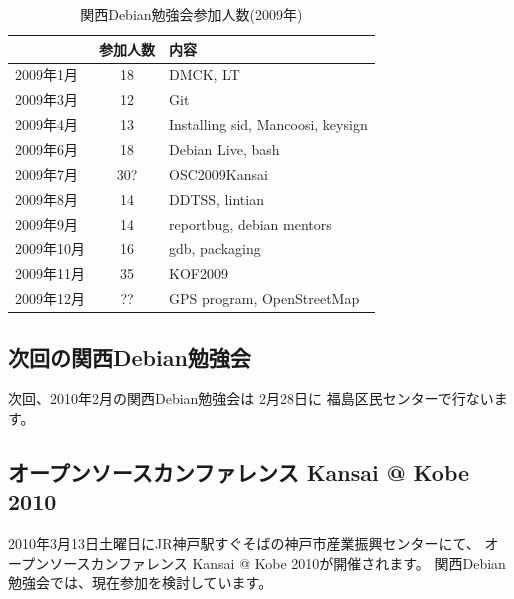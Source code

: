 \documentclass[mingoth,a4paper]{jsarticle}
\begin{document}
\begin{table}
\begin{minipage}{0.5\hsize}
\end{minipage}
\begin{minipage}{0.5\hsize}
 \caption{関西Debian勉強会参加人数(2009年)}\label{tab:count2009kansai}
 \begin{center}
  \begin{tabular}{|l|c|p{10em}|}
 \hline
 & 参加人数 & 内容 \\
 \hline
2009年1月 & 18 & DMCK, LT \\
2009年3月 & 12 & Git \\
2009年4月 & 13 & Installing sid, Mancoosi, keysign \\
2009年6月 & 18 & Debian Live, bash\\
2009年7月 & 30? & OSC2009Kansai \\
2009年8月 & 14 & DDTSS, lintian \\
2009年9月 & 14 & reportbug, debian mentors\\
2009年10月 & 16 & gdb, packaging \\
2009年11月 & 35 & KOF2009 \\
2009年12月 & ?? & GPS program, OpenStreetMap \\
 \hline
  \end{tabular}
 \end{center}
\end{minipage}
\end{table}

\clearpage


\subsection{次回の関西Debian勉強会}
次回、2010年2月の関西Debian勉強会は 2月28日に
福島区民センターで行ないます。

\subsection{オープンソースカンファレンス Kansai @ Kobe 2010}

2010年3月13日土曜日にJR神戸駅すぐそばの神戸市産業振興センターにて、
オープンソースカンファレンス Kansai @ Kobe 2010が開催されます。
関西Debian勉強会では、現在参加を検討しています。

\mbox{}\newpage

\printindex
 \cleartooddpage
\end{document}
